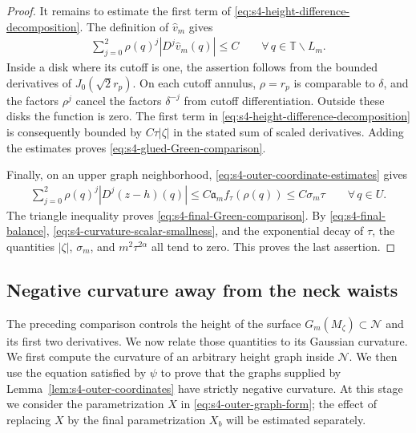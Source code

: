 \documentclass[a4paper,11pt,oneside,reqno]{amsart}
\numberwithin{equation}{section}
\theoremstyle{definition}
\begin{document}
\begin{proof}
    It remains to estimate the first term of
    \eqref{eq:s4-height-difference-decomposition}.
    The definition of $\widehat v_m$ gives
    \begin{align*}
        \sum_{j=0}^2\rho(q)^j|D^j\widehat v_m(q)|\leq C
        \qquad\forall\,q\in\mathbb T\smallsetminus L_m.
    \end{align*}
    Inside a disk where its cutoff is one, the assertion
    follows from the bounded derivatives of
    $J_0(\sqrt2r_p)$. On each cutoff annulus, $\rho=r_p$
    is comparable to $\delta$, and the factors $\rho^j$
    cancel the factors $\delta^{-j}$ from cutoff
    differentiation. Outside these disks the function is
    zero. The first term in
    \eqref{eq:s4-height-difference-decomposition} is
    consequently bounded by $C\tau|\zeta|$ in the
    stated sum of scaled derivatives.
    Adding the estimates proves
    \eqref{eq:s4-glued-Green-comparison}.

    Finally, on an upper graph neighborhood,
    \eqref{eq:s4-outer-coordinate-estimates} gives
    \begin{align*}
        \sum_{j=0}^2\rho(q)^j|D^j(z-h)(q)|
        \leq C\mathfrak a_m f_\tau(\rho(q))
        \leq C\sigma_m\tau
        \qquad\forall\,q\in U.
    \end{align*}
    The triangle inequality proves
    \eqref{eq:s4-final-Green-comparison}.
    By \eqref{eq:s4-final-balance},
    \eqref{eq:s4-curvature-scalar-smallness}, and the
    exponential decay of $\tau$, the quantities
    $|\zeta|$, $\sigma_m$, and $m^2\tau^{2\alpha}$
    all tend to zero. This proves the last assertion.
\end{proof}

\subsection{Negative curvature away from the neck waists}

The preceding comparison controls the height of the surface
$G_m(M_\zeta)\subset\mathcal N$ and its first two derivatives.
We now relate those quantities to its Gaussian curvature.
We first compute the curvature of an arbitrary height graph
inside $\mathcal N$. We then use the equation satisfied by
$\psi$ to prove that the graphs supplied by
Lemma~\ref{lem:s4-outer-coordinates} have strictly negative
curvature. At this stage we consider the parametrization
$X$ in \eqref{eq:s4-outer-graph-form}; the effect of replacing
$X$ by the final parametrization $X_b$ will be estimated
separately.
\end{document}
